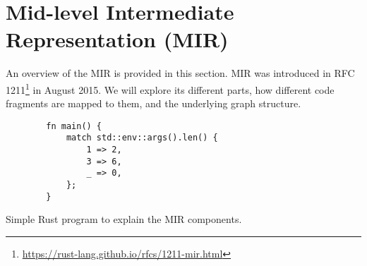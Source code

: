 \section{Mid-level Intermediate Representation (MIR)}

An overview of the \acrfull{MIR} is provided in this section.
\acrshort{MIR} was introduced in
RFC 1211\footnote{\url{https://rust-lang.github.io/rfcs/1211-mir.html}}
in August 2015.
We will explore its different parts,
how different code fragments are mapped to them,
and the underlying graph structure.

\begin{listing}
    \begin{verbatim}
        fn main() {
            match std::env::args().len() {
                1 => 2,
                3 => 6,
                _ => 0,
            };
        }
    \end{verbatim}
    \caption{Simple Rust program to explain the MIR components.}
    \label{lst:rust-code-example}
\end{listing}

